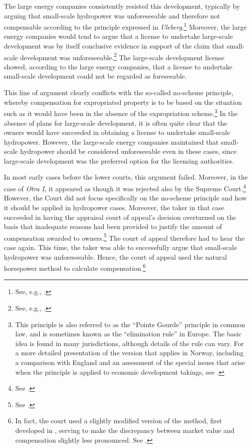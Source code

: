 The large energy companies consistently resisted this development, typically by arguing that small-scale hydropower was unforeseeable and therefore not compensable according to the principle expressed in {\it Uleberg}.\footnote{See, e.g., \cite{klovtveit11,otra10,otra13}.} Moreover, the large energy companies would tend to argue that a license to undertake large-scale development was by itself conclusive evidence in support of the claim that small-scale development was unforeseeable.\footnote{See, e.g., \cite[17]{otra10}.} The large-scale development license showed, according to the large energy companies, that a license to undertake small-scale development could not be regarded as foreseeable.

This line of argument clearly conflicts with the so-called no-scheme principle, whereby compensation for expropriated property is to be based on the situation such as it would have been in the absence of the expropriation scheme.\footnote{This principle is also referred to as the ``Pointe Gourde'' principle in common law, and is sometimes known as the ``elimination rule''  in Europe. The basic idea is found in many jurisdictions, although details of the rule can vary. For a more detailed presentation of the version that applies in Norway, including a comparison with England and an assessment of the special issues that arise when the principle is applied to economic development takings, see \cite{dyrkolbotn15}.} In the absence of plans for large-scale development, it is often quite clear that the owners would have succeeded in obtaining a license to undertake small-scale hydropower. However, the large-scale energy companies maintained that small-scale hydropower should be considered unforeseeable even in these cases, since large-scale development was the preferred option for the licensing authorities.

In most early cases before the lower courts, this argument failed. Moreover, in the case of {\it Otra I}, it appeared as though it was rejected also by the Supreme Court.\footnote{See \cite[31-48]{otra10}.} However, the Court did not focus specifically on the no-scheme principle and how it should be applied in hydropower cases. Moreover, the taker in that case succeeded in having the appraisal court of appeal's decision overturned on the basis that inadequate reasons had been provided to justify the amount of compensation awarded to owners.\footnote{See \cite[52]{otra10}.} The court of appeal therefore had to hear the case again. This time, the taker was able to successfully argue that small-scale hydropower was unforeseeable. Hence, the court of appeal used the natural horsepower method to calculate compensation.\footnote{In fact, the court used a slightly modified version of the method, first developed in \cite{sauda09}, serving to make the discrepancy between market value and compensation slightly less pronounced. See \cite{otra12}.} 

